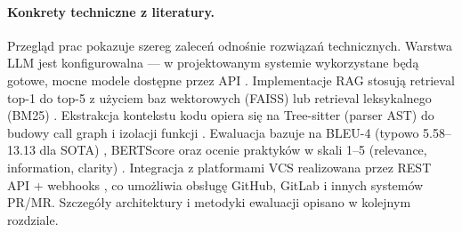 \paragraph{Konkrety techniczne z literatury.}
Przegląd prac pokazuje szereg zaleceń odnośnie rozwiązań technicznych. Warstwa LLM jest konfigurowalna — w projektowanym systemie 
wykorzystane będą gotowe, mocne modele dostępne przez API \cite{Pornprasit2024FineTuningPromptingCR, Lin2025CodeReviewQA}. 
Implementacje RAG stosują retrieval top-1 do top-5 z użyciem baz wektorowych (FAISS) \cite{Meng2025RARe} 
lub retrieval leksykalnego (BM25) \cite{Pornprasit2024FineTuningPromptingCR}. Ekstrakcja kontekstu kodu 
opiera się na Tree-sitter (parser AST) do budowy call graph i izolacji funkcji \cite{Ramesh2025EricssonExperience, Pornprasit2024FineTuningPromptingCR, Ren2025HydraReviewer}. 
Ewaluacja bazuje na BLEU-4 (typowo 5.58--13.13 dla SOTA) \cite{Pornprasit2024FineTuningPromptingCR, Meng2025RARe}, 
BERTScore oraz ocenie praktyków w skali 1--5 (relevance, information, clarity) \cite{Pornprasit2024FineTuningPromptingCR, Tang2025MoEReviewer}. 
Integracja z platformami VCS realizowana przez REST API + webhooks \cite{Ramesh2025EricssonExperience, Jaoua2025LLMStaticAnalyzersCR}, 
co umożliwia obsługę GitHub, GitLab i innych systemów PR/MR. Szczegóły architektury i metodyki ewaluacji opisano w kolejnym rozdziale.
